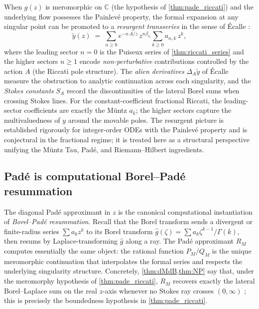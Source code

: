\documentclass[11pt,a4paper]{article}
\newcommand{\C}{\mathbb{C}}
\begin{document}
When \(g(z)\) is meromorphic on \(\C\) (the hypothesis of \cref{thm:pade_riccati}) and the underlying flow possesses the Painlev\'e property, the formal expansion at any singular point can be promoted to a \emph{resurgent transseries} in the sense of \'Ecalle \cite{ecalle1981,costin2008}:
\begin{equation}\label{eq:transseries}
\widetilde y(z)\;=\;\sum_{n\ge0}e^{-n\,A/z}\,z^{n\beta_n}\sum_{k\ge0}a_{n,k}\,z^k,
\end{equation}
where the leading sector \(n=0\) is the Puiseux series of \cref{thm:riccati_series} and the higher sectors \(n\ge1\) encode \emph{non-perturbative} contributions controlled by the action \(A\) (the Riccati pole structure).
The \emph{alien derivatives} \(\Delta_A\widetilde y\) of \'Ecalle measure the obstruction to analytic continuation across each singularity, and the \emph{Stokes constants} \(S_A\) record the discontinuities of the lateral Borel sums when crossing Stokes lines.
For the constant-coefficient fractional Riccati, the leading-sector coefficients are exactly the M\"untz \(a_k\); the higher sectors capture the multivaluedness of \(y\) around the movable poles.
The resurgent picture is established rigorously for integer-order ODEs with the Painlev\'e property and is conjectural in the fractional regime; it is treated here as a structural perspective unifying the M\"untz Tau, Pad\'e, and Riemann--Hilbert ingredients.

\subsection{Pad\'e is computational Borel--Pad\'e resummation}

The diagonal Pad\'e approximant in \(z\) is the canonical computational instantiation of \emph{Borel--Pad\'e resummation}.
Recall that the Borel transform sends a divergent or finite-radius series \(\sum a_k z^k\) to its Borel transform \(\widehat g(\zeta)=\sum a_k\zeta^{k-1}/\Gamma(k)\), then resums by Laplace-transforming \(\widehat g\) along a ray.
The Pad\'e approximant \(R_M\) computes essentially the same object: the rational function \(P_M/Q_M\) is the unique meromorphic continuation that interpolates the formal series and respects the underlying singularity structure.
Concretely, \cref{thm:dMdB,thm:NP} say that, under the meromorphy hypothesis of \cref{thm:pade_riccati}, \(R_M\) recovers exactly the lateral Borel--Laplace sum on the real \(z\)-axis whenever no Stokes ray crosses \((0,\infty)\) \cite{costin2008,pommerenke1973}; this is precisely the boundedness hypothesis in \cref{thm:pade_riccati}.
\end{document}
